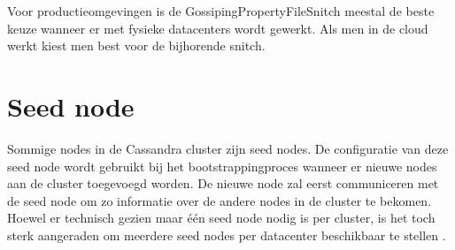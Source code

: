 Voor productieomgevingen is de GossipingPropertyFileSnitch meestal de beste keuze wanneer er met fysieke datacenters wordt gewerkt.
Als men in de cloud werkt kiest men best voor de bijhorende snitch.

\section{Seed node}
Sommige nodes in de Cassandra cluster zijn seed nodes.
De configuratie van deze seed node wordt gebruikt bij het bootstrappingproces wanneer er nieuwe nodes aan de cluster toegevoegd worden.
De nieuwe node zal eerst communiceren met de seed node om zo informatie over de andere nodes in de cluster te bekomen.
Hoewel er technisch gezien maar één seed node nodig is per cluster, is het toch sterk aangeraden om meerdere seed nodes per datacenter beschikbaar te stellen \citep{kan2014cassandra}.